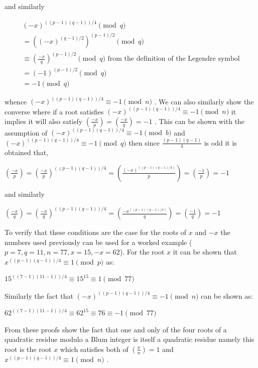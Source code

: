 \documentclass{article}
\begin{document}
and similarly

$$
\begin{array}{l}
    (-x)^{((p-1)(q-1))/4} \pmod{q} \\
    = ((-x)^{(q-1)/2})^{(p-1)/2} \pmod{q} \\
    \equiv \left(\frac{-x}{q}\right)^{(p-1)/2} \pmod{q} \mbox{  from the definition of the Legendre symbol} \\
    = (-1)^{(p-1)/2} \pmod{q}\\
    = -1 \pmod{q}
\end{array}
$$

whence $(-x)^{((p-1)(q-1))/4} \equiv -1 \pmod{n}$ \cite{Mora2013}. We can also similarly show the converse where if a root satisfies $(-x)^{((p-1)(q-1))/4} \equiv -1 \pmod{n}$ it implies it will also satisfy $\left(\frac{-x}{p}\right) = \left(\frac{-x}{q}\right) = -1$ \cite{Mora2013}. This can be shown with the assumption of $(-x)^{((p-1)(q-1))/4} \equiv -1 \pmod{b}$ and $(-x)^{((p-1)(q-1))/4} \equiv -1 \pmod{q}$ then since $\frac{(p-1)(q-1)}{4}$ is odd it is obtained that,

$\left(\frac{-x}{p}\right) = \left(\frac{-x}{p}\right)^{((p-1)(q-1))/4} = \left(\frac{(-x)^{((p-1)(q-1)/4)}}{p}\right) = \left(\frac{-1}{p}\right) = -1$

and similarly 

$\left(\frac{-x}{q}\right) = \left(\frac{-x}{q}\right)^{((p-1)(q-1))/4} = \left(\frac{-x^{((p-1)(q-1)/4)}}{q}\right) = \left(\frac{-1}{q}\right) = -1$

To verify that these conditions are the case for the roots of $x$ and $-x$ the numbers used previously can be used for a worked example ($p = 7, q=11, n=77, x=15, -x=62$). For the root $x$ it can be shown that $x^{((p-1)(q-1))/4} \equiv 1 \pmod{p}$ as:

$15^{((7-1)(11-1))/4} \equiv 15^15 \equiv 1 \pmod{77}$

Similarly the fact that $(-x)^{((p-1)(q-1))/4} \equiv -1 \pmod{n}$ can be shown as:

$62^{((7-1)(11-1))/4} \equiv 62^15 \equiv 76 \equiv -1 \pmod{77}$

From these proofs show the fact that one and only of the four roots of a quadratic residue modulo a Blum integer is itself a quadratic residue namely this root is the root $x$ which satisfies both of $\left(\frac{x}{n}\right) = 1$ and $x^{((p-1)(q-1))/4} \equiv 1 \pmod{n}$ \cite{Mora2013}. 
\end{document}
